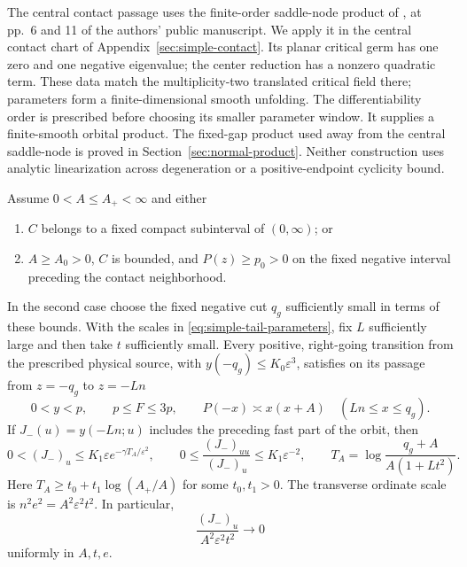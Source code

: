 The central contact passage uses the finite-order saddle-node product of
\cite[Theorem~3 and Section~2.8]{DIR2002}, at pp.~6 and 11 of
the authors' public manuscript. We apply it in the central contact chart
of Appendix~\ref{sec:simple-contact}.
Its planar critical germ has one zero and one negative eigenvalue;
the center reduction has a nonzero quadratic term. These data match
the multiplicity-two translated critical field there; parameters
form a finite-dimensional smooth unfolding. The differentiability
order is prescribed before choosing its smaller parameter window.
It supplies a finite-smooth orbital product. The fixed-gap product used
away from the central saddle-node is proved in
Section~\ref{sec:normal-product}. Neither construction uses analytic
linearization across degeneration or a positive-endpoint cyclicity bound.

\begin{lemma}\label{lem:negative-transition}
Assume $0<A\le A_+<\infty$ and either
\begin{enumerate}
\item $C$ belongs to a fixed compact subinterval of $(0,\infty)$; or
\item $A\ge A_0>0$, $C$ is bounded, and $P(z)\ge p_0>0$
on the fixed negative interval preceding the contact neighborhood.
\end{enumerate}
In the second case choose the fixed negative cut $q_g$ sufficiently
small in terms of these bounds. With the scales in \eqref{eq:simple-tail-parameters}, fix $L$
sufficiently large and then take $t$ sufficiently small. Every positive,
right-going transition from the prescribed physical source, with
$y(-q_g)\le K_0\varepsilon^3$, satisfies on its passage from
$z=-q_g$ to $z=-Ln$
\begin{equation}\label{eq:simple-negative-barrier}
 0<y<p,\qquad p\le F\le3p,\qquad
 P(-x)\asymp x(x+A)\quad(Ln\le x\le q_g).
\end{equation}
If $J_-(u)=y(-Ln;u)$ includes the preceding fast part of the orbit, then
\begin{equation}\label{eq:simple-negative-jets}
 0<(J_-)_u\le K_1\varepsilon e^{-\gamma T_A/\varepsilon^2},
 \qquad 0\le \frac{(J_-)_{uu}}{(J_-)_u}\le K_1\varepsilon^{-2},
 \qquad T_A=\log\frac{q_g+A}{A(1+Lt^2)}.
\end{equation}
Here $T_A\ge t_0+t_1\log(A_+/A)$ for some $t_0,t_1>0$.
The transverse ordinate scale is $n^2e^2=A^2\varepsilon^2t^2$.
In particular,
\begin{equation}\label{eq:simple-scale-cancellation}
 \frac{(J_-)_u}{A^2\varepsilon^2t^2}\longrightarrow0
\end{equation}
uniformly in $A,t,e$.
\end{lemma}


